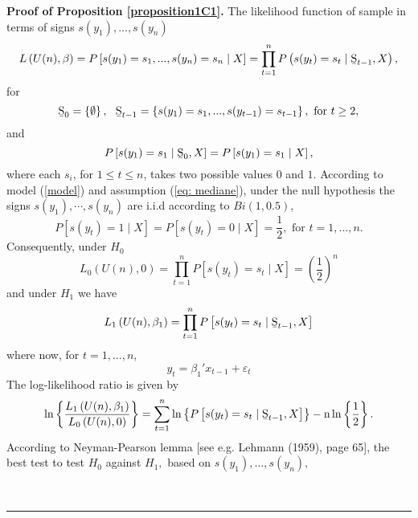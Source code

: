 \documentclass[harvard,11pt]{article}
\newenvironment{proof}[1][Proof]{\textbf{#1.} }{\  \rule{0.5em}{0.5em}}
\begin{document}
\begin{proof}[Proof of Proposition \protect\ref{proposition1C1}]
The likelihood function of sample in terms of signs $s(y_{1}),...,s(y_{n})$%
\begin{equation*}
L\left( U(n),\beta \right) =P\left[
s(y_{1})=s_{1},...,s(y_{n})=s_{n}\mid X\right] =\prod\limits_{t=1}^{n}%
P\left( s(y_{t})=s_{t}\mid \text{\b{S}}_{t-1},X\right) ,
\end{equation*}%
for 
\begin{equation*}
\text{\b{S}}_{0}=\left\{ \emptyset \right\} ,\text{ \ \b{S}}_{t-1}=\left\{
s(y_{1})=s_{1},...,s(y_{t-1})=s_{t-1}\right\} ,\text{ for }t\geq 2,
\end{equation*}%
and%
\begin{equation*}
P\left[ s(y_{1})=s_{1}\mid \text{\b{S}}_{0},X\right] =P%
\left[ s(y_{1})=s_{1}\mid X\right] ,
\end{equation*}%
where each $s_{i}$, for $1\leq t\leq n$, takes two possible values $0$ and $%
1 $. According to model (\ref{model}) and assumption (\ref{eq: mediane}), under the null hypothesis the signs $s(y_1),\cdots,s(y_n)$ are i.i.d according to $Bi(1,0.5)$,
\begin{equation*}
P\left[ s(y_{t})=1\mid X\right] =P\left[ s(y_{t})=0\mid X\right] =%
\frac{1}{2},\text{ for }t=1,...,n.
\end{equation*}%
Consequently, under $H_{0}$%
\begin{equation*}
L_{0}\left( U(n),0\right) =\prod\limits_{t=1}^{n}P\left[ s(y_{t})=s_{t}\mid X\right] =\left( \frac{1}{2}\right) ^{n}
\end{equation*}%
and under $H_{1}$ we have%
\begin{equation*}
L_{1}\left( U(n),\beta _{1}\right) =\prod\limits_{t=1}^{n}%
P\left[ s(y_{t})=s_{t}\mid \text{\b{S}}_{t-1}, X\right]
\end{equation*}%
where now, for $t=1,...,n,$%
\begin{equation*}
y_{t}=\beta_1'x_{t-1}+\varepsilon_{t}
\end{equation*}%
The log-likelihood ratio is given by%
\begin{equation*}
\ln \left\{ \frac{L_{1}\left( U(n),\beta _{1}\right) }{L%
_{0}\left( U(n),0\right) }\right\} =\sum\limits_{t=1}^{n}\ln \left\{ 
P\left[ s(y_{t})=s_{t}\mid \text{\b{S}}_{t-1},X\right] \right\} -\text{n}\ln
\left\{ \frac{1}{2}\right\} .
\end{equation*}%
According to Neyman-Pearson lemma [see e.g. Lehmann (1959), page 65], the
best test to test $H_{0}$ against $H_{1},$ based on $s(y_{1}),...,s(y_{n}),$

\end{proof}
\end{document}
